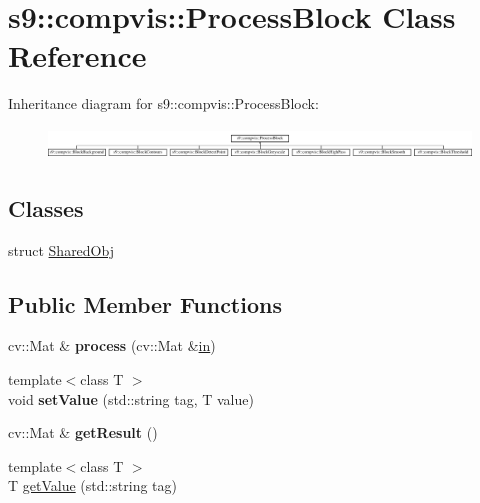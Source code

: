 \hypertarget{classs9_1_1compvis_1_1ProcessBlock}{\section{s9\-:\-:compvis\-:\-:Process\-Block Class Reference}
\label{classs9_1_1compvis_1_1ProcessBlock}
}
Inheritance diagram for s9\-:\-:compvis\-:\-:Process\-Block\-:\begin{figure}[H]
\begin{center}
\leavevmode
\includegraphics[height=0.842105cm]{classs9_1_1compvis_1_1ProcessBlock}
\end{center}
\end{figure}
\subsection*{Classes}
\begin{DoxyCompactItemize}
\item 
struct \hyperlink{structs9_1_1compvis_1_1ProcessBlock_1_1SharedObj}{Shared\-Obj}
\end{DoxyCompactItemize}
\subsection*{Public Member Functions}
\begin{DoxyCompactItemize}
\item 
\hypertarget{classs9_1_1compvis_1_1ProcessBlock_ac17fb013ecbc90008daeea97502540d2}{cv\-::\-Mat \& {\bfseries process} (cv\-::\-Mat \&\hyperlink{structin}{in})}\label{classs9_1_1compvis_1_1ProcessBlock_ac17fb013ecbc90008daeea97502540d2}

\item 
\hypertarget{classs9_1_1compvis_1_1ProcessBlock_a95e7672ada69c3f846380b2be57f193d}{{\footnotesize template$<$class T $>$ }\\void {\bfseries set\-Value} (std\-::string tag, T value)}\label{classs9_1_1compvis_1_1ProcessBlock_a95e7672ada69c3f846380b2be57f193d}

\item 
\hypertarget{classs9_1_1compvis_1_1ProcessBlock_ac5174987a6d59e389e95b8435fa57687}{cv\-::\-Mat \& {\bfseries get\-Result} ()}\label{classs9_1_1compvis_1_1ProcessBlock_ac5174987a6d59e389e95b8435fa57687}

\item 
{\footnotesize template$<$class T $>$ }\\T \hyperlink{classs9_1_1compvis_1_1ProcessBlock_a2189359475f02db5e99e699a4a9a5fa0}{get\-Value} (std\-::string tag)
\end{DoxyCompactItemize}
